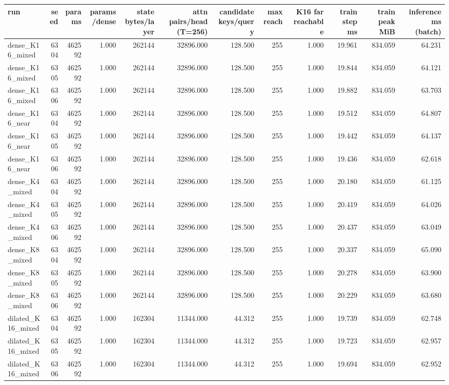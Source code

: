 \begin{tabular}{lrrrrrrrrrrr}
\toprule
run & seed & params & params/dense & state bytes/layer & attn pairs/head (T=256) & candidate keys/query & max reach & K16 far reachable & train step ms & train peak MiB & inference ms (batch) \\
\midrule
dense\_K16\_mixed & 6304 & 462592 & 1.000 & 262144 & 32896.000 & 128.500 & 255 & 1.000 & 19.961 & 834.059 & 64.231 \\
dense\_K16\_mixed & 6305 & 462592 & 1.000 & 262144 & 32896.000 & 128.500 & 255 & 1.000 & 19.844 & 834.059 & 64.121 \\
dense\_K16\_mixed & 6306 & 462592 & 1.000 & 262144 & 32896.000 & 128.500 & 255 & 1.000 & 19.882 & 834.059 & 63.703 \\
dense\_K16\_near & 6304 & 462592 & 1.000 & 262144 & 32896.000 & 128.500 & 255 & 1.000 & 19.512 & 834.059 & 64.807 \\
dense\_K16\_near & 6305 & 462592 & 1.000 & 262144 & 32896.000 & 128.500 & 255 & 1.000 & 19.442 & 834.059 & 64.137 \\
dense\_K16\_near & 6306 & 462592 & 1.000 & 262144 & 32896.000 & 128.500 & 255 & 1.000 & 19.436 & 834.059 & 62.618 \\
dense\_K4\_mixed & 6304 & 462592 & 1.000 & 262144 & 32896.000 & 128.500 & 255 & 1.000 & 20.180 & 834.059 & 61.125 \\
dense\_K4\_mixed & 6305 & 462592 & 1.000 & 262144 & 32896.000 & 128.500 & 255 & 1.000 & 20.419 & 834.059 & 64.026 \\
dense\_K4\_mixed & 6306 & 462592 & 1.000 & 262144 & 32896.000 & 128.500 & 255 & 1.000 & 20.437 & 834.059 & 63.049 \\
dense\_K8\_mixed & 6304 & 462592 & 1.000 & 262144 & 32896.000 & 128.500 & 255 & 1.000 & 20.337 & 834.059 & 65.090 \\
dense\_K8\_mixed & 6305 & 462592 & 1.000 & 262144 & 32896.000 & 128.500 & 255 & 1.000 & 20.278 & 834.059 & 63.900 \\
dense\_K8\_mixed & 6306 & 462592 & 1.000 & 262144 & 32896.000 & 128.500 & 255 & 1.000 & 20.229 & 834.059 & 63.680 \\
dilated\_K16\_mixed & 6304 & 462592 & 1.000 & 162304 & 11344.000 & 44.312 & 255 & 1.000 & 19.739 & 834.059 & 62.748 \\
dilated\_K16\_mixed & 6305 & 462592 & 1.000 & 162304 & 11344.000 & 44.312 & 255 & 1.000 & 19.723 & 834.059 & 62.957 \\
dilated\_K16\_mixed & 6306 & 462592 & 1.000 & 162304 & 11344.000 & 44.312 & 255 & 1.000 & 19.694 & 834.059 & 62.952 \\

\end{tabular}
